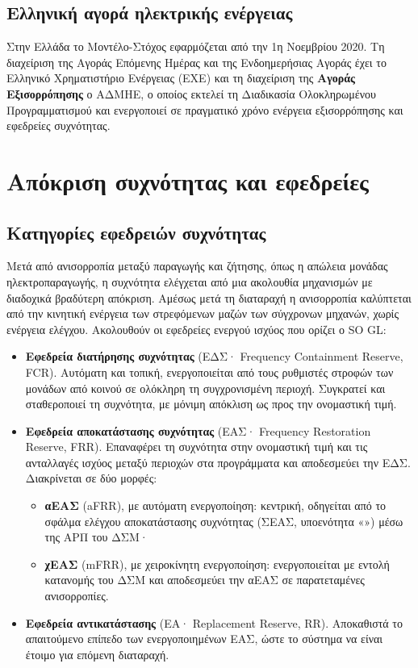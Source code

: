 \subsection{Ελληνική αγορά ηλεκτρικής ενέργειας}

Στην Ελλάδα το Μοντέλο-Στόχος εφαρμόζεται από την 1η Νοεμβρίου 2020. Τη διαχείριση της
Αγοράς Επόμενης Ημέρας και της Ενδοημερήσιας Αγοράς έχει το Ελληνικό Χρηματιστήριο Ενέργειας
(ΕΧΕ) και τη διαχείριση της \textbf{Αγοράς Εξισορρόπησης} ο ΑΔΜΗΕ, ο οποίος εκτελεί τη
Διαδικασία Ολοκληρωμένου Προγραμματισμού και ενεργοποιεί σε πραγματικό χρόνο ενέργεια
εξισορρόπησης και εφεδρείες συχνότητας.

\section{Απόκριση συχνότητας και εφεδρείες}

\subsection{Κατηγορίες εφεδρειών συχνότητας}
\label{sec:reserves}

Μετά από ανισορροπία μεταξύ παραγωγής και ζήτησης, όπως η απώλεια μονάδας ηλεκτροπαραγωγής, η
συχνότητα ελέγχεται από μια ακολουθία μηχανισμών με διαδοχικά βραδύτερη απόκριση. Αμέσως μετά
τη διαταραχή η ανισορροπία καλύπτεται από την κινητική ενέργεια των στρεφόμενων μαζών των
σύγχρονων μηχανών, χωρίς ενέργεια ελέγχου. Ακολουθούν οι εφεδρείες ενεργού ισχύος που ορίζει ο
SO GL:

\begin{itemize}
\item \textbf{Εφεδρεία διατήρησης συχνότητας} (ΕΔΣ· Frequency Containment Reserve, FCR).
      Αυτόματη και τοπική, ενεργοποιείται από τους ρυθμιστές στροφών των μονάδων από κοινού σε
      ολόκληρη τη συγχρονισμένη περιοχή. Συγκρατεί και σταθεροποιεί τη συχνότητα, με μόνιμη
      απόκλιση ως προς την ονομαστική τιμή.
\item \textbf{Εφεδρεία αποκατάστασης συχνότητας} (ΕΑΣ· Frequency Restoration Reserve, FRR).
      Επαναφέρει τη συχνότητα στην ονομαστική τιμή και τις ανταλλαγές ισχύος μεταξύ περιοχών
      στα προγράμματα και αποδεσμεύει την ΕΔΣ. Διακρίνεται σε δύο μορφές:
      \begin{itemize}
      \item \textbf{αΕΑΣ} (aFRR), με αυτόματη ενεργοποίηση: κεντρική, οδηγείται από το σφάλμα
            ελέγχου αποκατάστασης συχνότητας (ΣΕΑΣ, υποενότητα «») μέσω της ΑΡΠ του
            ΔΣΜ·
      \item \textbf{χΕΑΣ} (mFRR), με χειροκίνητη ενεργοποίηση: ενεργοποιείται με εντολή
            κατανομής του ΔΣΜ και αποδεσμεύει την αΕΑΣ σε παρατεταμένες ανισορροπίες.
      \end{itemize}
\item \textbf{Εφεδρεία αντικατάστασης} (ΕΑ· Replacement Reserve, RR). Αποκαθιστά το απαιτούμενο
      επίπεδο των ενεργοποιημένων ΕΑΣ, ώστε το σύστημα να είναι έτοιμο για επόμενη διαταραχή.
\end{itemize}


